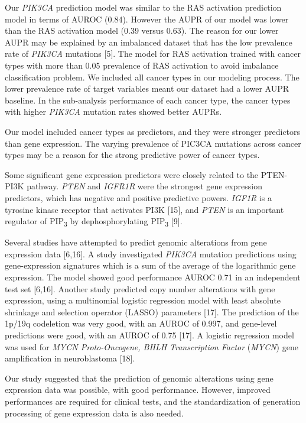 \documentclass[10pt,letterpaper]{article}
\begin{document}
Our \emph{PIK3CA} prediction model was similar to the RAS activation
prediction model in terms of AUROC (0.84). However the AUPR of our model
was lower than the RAS activation model (0.39 versus 0.63). The reason
for our lower AUPR may be explained by an imbalanced dataset that has
the low prevalence rate of \emph{PIK3CA} mutations {[}5{]}. The model
for RAS activation trained with cancer types with more than 0.05
prevalence of RAS activation to avoid imbalance classification problem.
We included all cancer types in our modeling process. The lower
prevalence rate of target variables meant our dataset had a lower AUPR
baseline. In the sub-analysis performance of each cancer type, the
cancer types with higher \emph{PIK3CA} mutation rates showed better
AUPRs.

Our model included cancer types as predictors, and they were stronger
predictors than gene expression. The varying prevalence of PIC3CA
mutations across cancer types may be a reason for the strong predictive
power of cancer types.

Some significant gene expression predictors were closely related to the
PTEN-PI3K pathway. \emph{PTEN} and \emph{IGFR1R} were the strongest gene
expression predictors, which has negative and positive predictive
powers. \emph{IGF1R} is a tyrosine kinase receptor that activates PI3K
{[}15{]}, and \emph{PTEN} is an important regulator of
PIP\textsubscript{3} by dephosphorylating PIP\textsubscript{3} {[}9{]}.

Several studies have attempted to predict genomic alterations from gene
expression data {[}6,16{]}. A study investigated \emph{PIK3CA} mutation
predictions using gene-expression signatures which is a sum of the
average of the logarithmic gene expression. The model showed good
performance AUROC 0.71 in an independent test set {[}6,16{]}. Another
study predicted copy number alterations with gene expression, using a
multinomial logistic regression model with least absolute shrinkage and
selection operator (LASSO) parameters {[}17{]}. The prediction of the
1p/19q codeletion was very good, with an AUROC of 0.997, and gene-level
predictions were good, with an AUROC of 0.75 {[}17{]}. A logistic
regression model was used for \emph{MYCN Proto-Oncogene, BHLH
Transcription Factor} (\emph{MYCN}) gene amplification in neuroblastoma
{[}18{]}.

Our study suggested that the prediction of genomic alterations using
gene expression data was possible, with good performance. However,
improved performances are required for clinical tests, and the
standardization of generation processing of gene expression data is also
needed.
\end{document}
